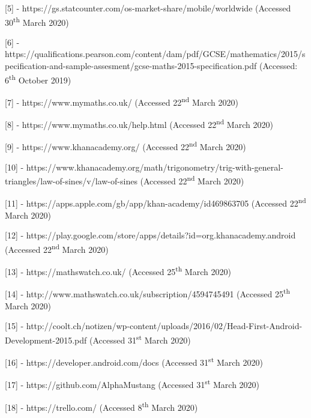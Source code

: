 \documentclass{article}
\begin{document}
[5] - https://gs.statcounter.com/os-market-share/mobile/worldwide (Accessed 30\textsuperscript{th} March 2020) \par

[6] - https://qualifications.pearson.com/content/dam/pdf/GCSE/mathematics/2015/specification-and-sample-assesment/gcse-maths-2015-specification.pdf (Accessed: 6\textsuperscript{th} October 2019) \par

[7] - https://www.mymaths.co.uk/ (Accessed 22\textsuperscript{nd} March 2020) \par

[8] - https://www.mymaths.co.uk/help.html (Accessed 22\textsuperscript{nd} March 2020) \par

[9] - https://www.khanacademy.org/ (Accessed 22\textsuperscript{nd} March 2020) \par

[10] - https://www.khanacademy.org/math/trigonometry/trig-with-general-triangles/law-of-sines/v/law-of-sines (Accessed 22\textsuperscript{nd} March 2020) \par

[11] - https://apps.apple.com/gb/app/khan-academy/id469863705 (Accessed 22\textsuperscript{nd} March 2020) \par

[12] - https://play.google.com/store/apps/details?id=org.khanacademy.android (Accessed 22\textsuperscript{nd} March 2020) \par

[13] - https://mathswatch.co.uk/ (Accessed 25\textsuperscript{th} March 2020) \par

[14] - http://www.mathswatch.co.uk/subscription/4594745491 (Accessed 25\textsuperscript{th} March 2020) \par

[15] - http://coolt.ch/notizen/wp-content/uploads/2016/02/Head-First-Android-Development-2015.pdf (Accessed 31\textsuperscript{st} March 2020) \par

[16] - https://developer.android.com/docs (Accessed 31\textsuperscript{st} March 2020) \par

[17] - https://github.com/AlphaMustang (Accessed 31\textsuperscript{st} March 2020) \par

[18] - https://trello.com/ (Accessed 8\textsuperscript{th} March 2020) \par
\end{document}
